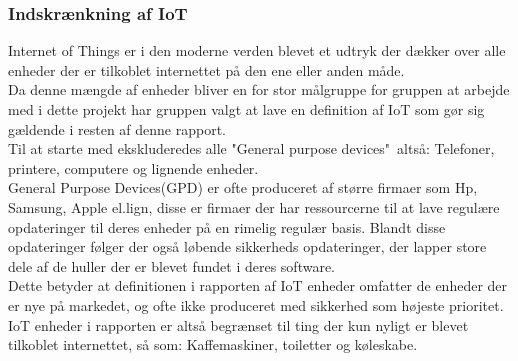     
            \subsubsection{Indskrænkning af IoT} 
            Internet of Things er i den moderne verden blevet et udtryk der dækker over alle enheder der er tilkoblet internettet på den ene eller anden måde.\\
            Da denne mængde af enheder bliver en for stor målgruppe for gruppen at arbejde med i dette projekt har gruppen valgt at lave en definition af IoT som gør sig gældende i resten af denne rapport. \\
            Til at starte med ekskluderedes alle "General purpose devices"\ altså: Telefoner, printere, computere og lignende enheder. \\
            General Purpose Devices(GPD) er ofte produceret af større firmaer som Hp, Samsung, Apple el.lign, disse er firmaer der har ressourcerne til at lave regulære opdateringer til deres enheder på en rimelig regulær basis. Blandt disse opdateringer følger der også løbende sikkerheds opdateringer, der lapper store dele af de huller der er blevet fundet i deres software.\\
            Dette betyder at definitionen i rapporten af IoT enheder omfatter de enheder der er nye på markedet, og ofte ikke produceret med sikkerhed som højeste prioritet. IoT enheder i rapporten er altså begrænset til ting der kun nyligt er blevet tilkoblet internettet, så som: Kaffemaskiner, toiletter og køleskabe. \\
            

\newpage


